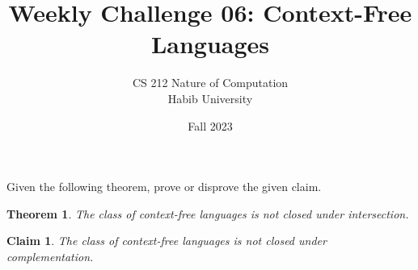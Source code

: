 \documentclass[a4paper]{exam}
\title{Weekly Challenge 06: Context-Free Languages}
\author{CS 212 Nature of Computation\\Habib University}
\date{Fall 2023}
\theoremstyle{theorem}
\newtheorem{theorem}{Theorem}
\theoremstyle{claim}
\newtheorem{claim}{Claim}
\begin{document}
\maketitle

\begin{questions}


  Given the following theorem, prove or disprove the given claim.

  \begin{theorem}
    The class of context-free languages is not closed under intersection.
  \end{theorem}
  \begin{claim}
    The class of context-free languages is not closed under complementation.
  \end{claim}

  \begin{solution}
  \end{solution}
  
\end{questions}
\end{document}
